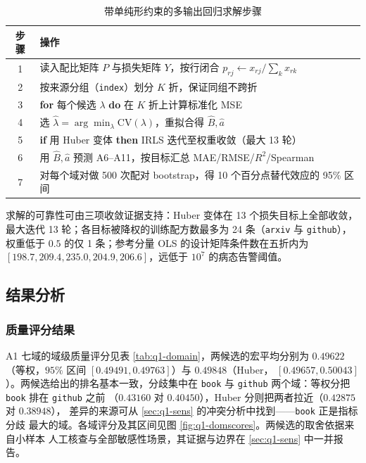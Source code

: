 \documentclass[bwprint]{gmcmthesis}
\numberwithin{equation}{section}
\numberwithin{figure}{section}
\numberwithin{table}{section}
\begin{document}
\begin{table}[htp!]
\centering
\renewcommand\arraystretch{1.2}
\caption{带单纯形约束的多输出回归求解步骤}\label{alg:q1-solve}
\begin{tabularx}{\textwidth}{cX}
\toprule
步骤 & 操作 \\
\midrule
1 & 读入配比矩阵 $P$ 与损失矩阵 $Y$，按行闭合 $p_{rj}\leftarrow x_{rj}/\sum_k x_{rk}$ \\
2 & 按来源分组（\texttt{index}）划分 $K$ 折，保证同组不跨折 \\
3 & \textbf{for} 每个候选 $\lambda$ \textbf{do} 在 $K$ 折上计算标准化 MSE \\
4 & 选 $\hat\lambda=\arg\min_\lambda \mathrm{CV}(\lambda)$，重拟合得 $\hat B,\hat a$ \\
5 & \textbf{if} 用 Huber 变体 \textbf{then} IRLS 迭代至权重收敛（最大 13 轮） \\
6 & 用 $\hat B,\hat a$ 预测 A6--A11，按目标汇总 MAE/RMSE/$R^2$/Spearman \\
7 & 对每个域对做 500 次配对 bootstrap，得 10 个百分点替代效应的 95\% 区间 \\
\bottomrule
\end{tabularx}
\end{table}

求解的可靠性可由三项收敛证据支持：Huber 变体在 13 个损失目标上全部收敛，最大迭代
13 轮；各目标被降权的训练配方数最多为 24 条（\texttt{arxiv} 与 \texttt{github}），
权重低于 $0.5$ 的仅 1 条；参考分量 OLS 的设计矩阵条件数在五折内为
$[198.7,209.4,235.0,204.9,206.6]$，远低于 $10^7$ 的病态告警阈值。

\subsection{结果分析}

\subsubsection{质量评分结果}\label{sec:q1-scoreres}

A1 七域的域级质量评分见表 \ref{tab:q1-domain}，两候选的宏平均分别为 $0.49622$
（等权，$95\%$ 区间 $[0.49491,0.49763]$）与 $0.49848$（Huber，
$[0.49657,0.50043]$）。两候选给出的排名基本一致，分歧集中在 \texttt{book} 与
\texttt{github} 两个域：等权分把 \texttt{book} 排在 \texttt{github} 之前
（$0.43160$ 对 $0.40450$），Huber 分则把两者拉近（$0.42875$ 对 $0.38948$），
差异的来源可从 \ref{sec:q1-sens} 的冲突分析中找到——\texttt{book} 正是指标分歧
最大的域。各域评分及其区间见图 \ref{fig:q1-domscores}。两候选的取舍依据来自小样本
人工核查与全部敏感性场景，其证据与边界在 \ref{sec:q1-sens} 中一并报告。
\end{document}
